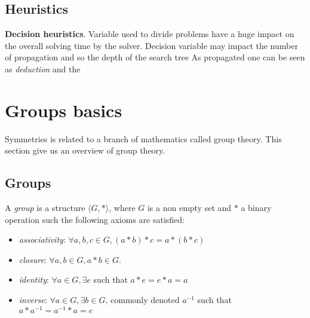 \subsection{Heuristics}

\textbf{Decision heuristics}. Variable used to divide problems have a huge impact on the 
overall solving time by the solver. Decision variable may impact the number of propagation and so the depth of the search tree  As propagated one can be seen as \emph{deduction} and the 






\section{Groups basics}

Symmetries is related to a branch of mathematics called group theory. This section give us an overview of group
theory.

\subsection{Groups}

A \emph{group} is a structure $\langle G, * \rangle$, where $G$ is a non empty set and $*$ a binary
operation such the following axioms are satisfied:
\begin{itemize}[noitemsep,nolistsep]
	\item \emph{associativity}: $\forall a, b, c \in G, (a * b) * c = a * (b * c)$
	\item \emph{closure}: $\forall a, b \in G, a * b \in G$.
	\item \emph{identity}: $\forall a \in G, \exists e$ such that $ a * e = e * a = a$
	\item \emph{inverse}:  $\forall a \in G, \exists b \in G$, commonly denoted $a^{-1}$ such that
	 $a * a^{-1} = a^{-1} * a = e$
\end{itemize}

